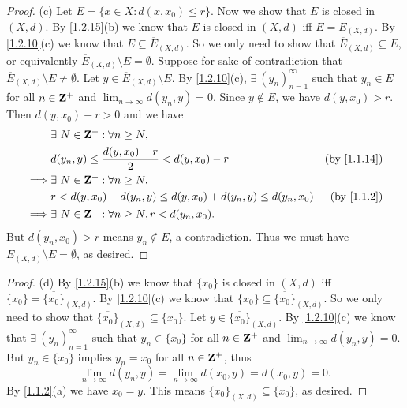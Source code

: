\begin{proof}{(c)}
  Let \(E = \{x \in X : d(x, x_0) \leq r\}\).
  Now we show that \(E\) is closed in \((X, d)\).
  By \cref{1.2.15}(b) we know that \(E\) is closed in \((X, d)\) iff \(E = \overline{E}_{(X, d)}\).
  By \cref{1.2.10}(c) we know that \(E \subseteq \overline{E}_{(X, d)}\).
  So we only need to show that \(\overline{E}_{(X, d)} \subseteq E\), or equivalently \(\overline{E}_{(X, d)} \setminus E = \emptyset\).
  Suppose for sake of contradiction that \(\overline{E}_{(X, d)} \setminus E \neq \emptyset\).
  Let \(y \in \overline{E}_{(X, d)} \setminus E\).
  By \cref{1.2.10}(c), \(\exists\ (y_n)_{n = 1}^\infty\) such that \(y_n \in E\) for all \(n \in \mathbf{Z}^+\) and \(\lim_{n \to \infty} d(y_n, y) = 0\).
  Since \(y \notin E\), we have \(d(y, x_0) > r\).
  Then \(d(y, x_0) - r > 0\) and we have
  \begin{align*}
             & \exists\ N \in \Z^+ : \forall n \geq N,                                                           \\
             & d(y_n, y) \leq \frac{d(y, x_0) - r}{2} < d(y, x_0) - r                & \text{(by \cref{1.1.14})} \\
    \implies & \exists\ N \in \Z^+ : \forall n \geq N,                                                           \\
             & r < d(y, x_0) - d(y_n, y) \leq d(y, x_0) + d(y_n, y) \leq d(y_n, x_0) & \text{(by \cref{1.1.2})}  \\
    \implies & \exists\ N \in \Z^+ : \forall n \geq N, r < d(y_n, x_0).
  \end{align*}
  But \(d(y_n, x_0) > r\) means \(y_n \notin E\), a contradiction.
  Thus we must have \(\overline{E}_{(X, d)} \setminus E = \emptyset\), as desired.
\end{proof}

\begin{proof}{(d)}
  By \cref{1.2.15}(b) we know that \(\{x_0\}\) is closed in \((X, d)\) iff \(\{x_0\} = \overline{\{x_0\}}_{(X, d)}\).
  By \cref{1.2.10}(c) we know that \(\{x_0\} \subseteq \overline{\{x_0\}}_{(X, d)}\).
  So we only need to show that \(\overline{\{x_0\}}_{(X, d)} \subseteq \{x_0\}\).
  Let \(y \in \overline{\{x_0\}}_{(X, d)}\).
  By \cref{1.2.10}(c) we know that \(\exists\ (y_n)_{n = 1}^\infty\) such that \(y_n \in \{x_0\}\) for all \(n \in \mathbf{Z}^+\) and \(\lim_{n \to \infty} d(y_n, y) = 0\).
  But \(y_n \in \{x_0\}\) implies \(y_n = x_0\) for all \(n \in \mathbf{Z}^+\), thus
  \[
    \lim_{n \to \infty} d(y_n, y) = \lim_{n \to \infty} d(x_0, y) = d(x_0, y) = 0.
  \]
  By \cref{1.1.2}(a) we have \(x_0 = y\).
  This means \(\overline{\{x_0\}}_{(X, d)} \subseteq \{x_0\}\), as desired.
\end{proof}

